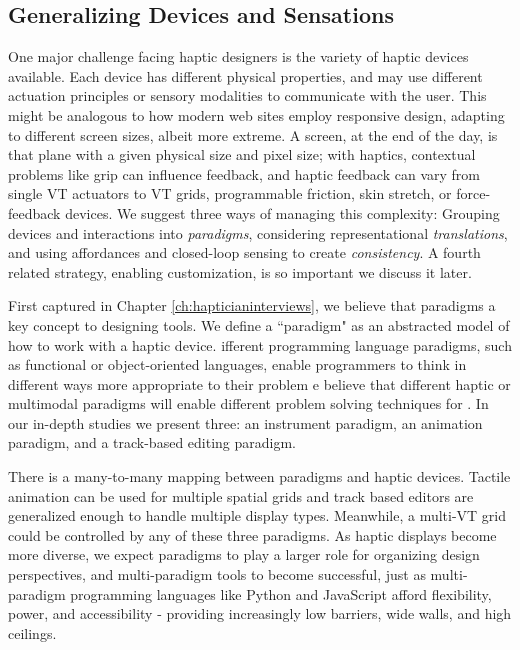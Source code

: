 \subsection{Generalizing Devices and Sensations}
\label{sec:generalizingdevices}
One major challenge facing haptic designers is the variety of haptic devices available.
Each device has different physical properties, and may use different actuation principles or sensory modalities to communicate with the user.
This might be analogous to how modern web sites employ responsive design, adapting to different screen sizes, albeit more extreme.
A screen, at the end of the day, is that plane with a given physical size and pixel size; with haptics,
contextual problems like grip can influence feedback, and haptic feedback can vary from single VT actuators to VT grids, programmable friction, skin stretch, or force-feedback devices.
We suggest three ways of managing this complexity:
Grouping devices and interactions into \emph{paradigms},
considering representational \emph{translations}, and
using affordances and closed-loop sensing to create \emph{consistency}.
A fourth related strategy, enabling customization, is so important we discuss it later.


First captured in Chapter \ref{ch:hapticianinterviews}, we believe that paradigms  a key concept to designing \haxd tools.
We define a ``paradigm" as an abstracted model of how to work with a haptic device.
ifferent programming language paradigms, such as functional or object-oriented languages, enable programmers to think in different ways more appropriate to their problem
e believe that different haptic or multimodal paradigms will enable different problem solving techniques for \haxd.
In our in-depth studies we present three: an instrument paradigm, an animation paradigm, and a track-based editing paradigm.

There is a many-to-many mapping between paradigms and haptic devices.
Tactile animation can be used for multiple spatial grids and track based editors are generalized enough to handle multiple display types.
Meanwhile, a multi-VT grid could be controlled by any of these three paradigms.
As haptic displays become more diverse, we expect paradigms to play a larger role for organizing design perspectives, and multi-paradigm tools to become successful, just as multi-paradigm programming languages like Python and JavaScript afford flexibility, power, and accessibility - providing increasingly low barriers, wide walls, and high ceilings.


